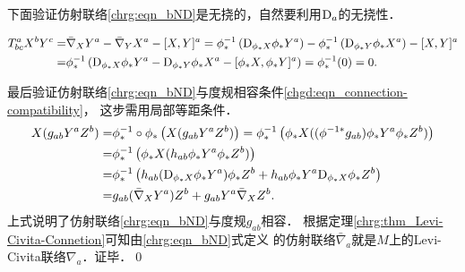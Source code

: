 下面验证仿射联络\eqref{chrg:eqn_bND}是无挠的，自然要利用${\rm D}_a$的无挠性．
\begin{small}
\begin{align*}
	T^a_{bc} X^b Y^c = & \bar{\nabla}_X Y^a - \bar{\nabla}_Y X^a -[X,Y]^a 
	=  \phi^{-1}_* \left( {\rm D}_{\phi_* X} \phi_*Y^a \right) 
	-\phi^{-1}_* \left( {\rm D}_{\phi_* Y} \phi_*X^a \right) -[X,Y]^a \\
	=&\phi^{-1}_* \left( {\rm D}_{\phi_* X} \phi_*Y^a 
	-  {\rm D}_{\phi_* Y} \phi_*X^a -[\phi_*X,\phi_*Y]^a \right) 
	=\phi^{-1}_*(0) = 0.
\end{align*} %
\end{small}
最后验证仿射联络\eqref{chrg:eqn_bND}与度规相容条件\eqref{chgd:eqn_connection-compatibility}，
这步需用局部等距条件．
\begin{align*}
	X(g_{ab} Y^a Z^b) = & \phi^{-1}_*\circ \phi_* \left(X(g_{ab} Y^a Z^b) \right)
	=\phi^{-1}_*  \left(\phi_* X( (\phi^{-1*}g_{ab}) \phi_*Y^a \phi_*Z^b) \right) \\
	=& \phi^{-1}_*  \left(\phi_* X(h_{ab} \phi_*Y^a \phi_*Z^b) \right)\\
	=& \phi^{-1}_*  \left(h_{ab} ({\rm D}_{\phi_* X} \phi_*Y^a) \phi_*Z^b
	 + h_{ab} \phi_*Y^a {\rm D}_{\phi_* X}\phi_*Z^b\right) \\
	=&g_{ab} (\bar{\nabla}_{X} Y^a) Z^b + g_{ab} Y^a \bar{\nabla}_{X} Z^b .
\end{align*}
上式说明了仿射联络\eqref{chrg:eqn_bND}与度规$g_{ab}$相容．
根据定理\ref{chrg:thm_Levi-Civita-Connetion}可知由\eqref{chrg:eqn_bND}式定义
的仿射联络$\bar{\nabla}_a$就是$M$上的Levi-Civita联络${\nabla}_a$．证毕．\qed



